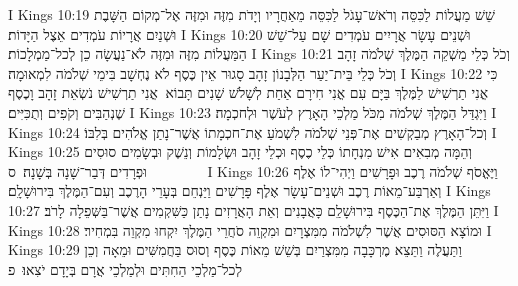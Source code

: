 I Kings 10:19	שֵׁשׁ מַעֲלוֹת לַכִּסֵּה וְרֹאשׁ־עָגֹל לַכִּסֵּה מֵאַחֲרָיו וְיָדֹת מִזֶּה וּמִזֶּה אֶל־מְקוֹם הַשָּׁבֶת וּשְׁנַיִם אֲרָיוֹת עֹמְדִים אֵצֶל הַיָּדוֹת׃
I Kings 10:20	וּשְׁנֵים עָשָׂר אֲרָיִים עֹמְדִים שָׁם עַל־שֵׁשׁ הַמַּעֲלוֹת מִזֶּה וּמִזֶּה לֹא־נַעֲשָׂה כֵן לְכל־מַמְלָכוֹת׃
I Kings 10:21	וְכֹל כְּלֵי מַשְׁקֵה הַמֶּלֶךְ שְׁלֹמֹה זָהָב וְכֹל כְּלֵי בֵּית־יַעַר הַלְּבָנוֹן זָהָב סָגוּר אֵין כֶּסֶף לֹא נֶחְשָׁב בִּימֵי שְׁלֹמֹה לִמְאוּמָה׃
I Kings 10:22	כִּי אֳנִי תַרְשִׁישׁ לַמֶּלֶךְ בַּיָּם עִם אֳנִי חִירָם אַחַת לְשָׁלֹשׁ שָׁנִים תָּבוֹא  אֳנִי תַרְשִׁישׁ נֹשְׂאֵת זָהָב וָכֶסֶף שֶׁנְהַבִּים וְקֹפִים וְתֻכִּיִּים׃
I Kings 10:23	וַיִּגְדַּל הַמֶּלֶךְ שְׁלֹמֹה מִכֹּל מַלְכֵי הָאָרֶץ לְעֹשֶׁר וּלְחכְמָה׃
I Kings 10:24	וְכל־הָאָרֶץ מְבַקְשִׁים אֶת־פְּנֵי שְׁלֹמֹה לִשְׁמֹעַ אֶת־חכְמָתוֹ אֲשֶׁר־נָתַן אֱלֹהִים בְּלִבּוֹ׃
I Kings 10:25	וְהֵמָּה מְבִאִים אִישׁ מִנְחָתוֹ כְּלֵי כֶסֶף וּכְלֵי זָהָב וּשְׂלָמוֹת וְנֵשֶׁק וּבְשָׂמִים סוּסִים וּפְרָדִים דְּבַר־שָׁנָה בְּשָׁנָה׃ {ס}        
I Kings 10:26	וַיֶּאֱסֹף שְׁלֹמֹה רֶכֶב וּפָרָשִׁים וַיְהִי־לוֹ אֶלֶף וְאַרְבַּע־מֵאוֹת רֶכֶב וּשְׁנֵים־עָשָׂר אֶלֶף פָּרָשִׁים וַיַּנְחֵם בְּעָרֵי הָרֶכֶב וְעִם־הַמֶּלֶךְ בִּירוּשָׁלָ͏ִם׃
I Kings 10:27	וַיִּתֵּן הַמֶּלֶךְ אֶת־הַכֶּסֶף בִּירוּשָׁלַ͏ִם כָּאֲבָנִים וְאֵת הָאֲרָזִים נָתַן כַּשִּׁקְמִים אֲשֶׁר־בַּשְּׁפֵלָה לָרֹב׃
I Kings 10:28	וּמוֹצָא הַסּוּסִים אֲשֶׁר לִשְׁלֹמֹה מִמִּצְרָיִם וּמִקְוֵה סֹחֲרֵי הַמֶּלֶךְ יִקְחוּ מִקְוֵה בִּמְחִיר׃
I Kings 10:29	וַתַּעֲלֶה וַתֵּצֵא מֶרְכָּבָה מִמִּצְרַיִם בְּשֵׁשׁ מֵאוֹת כֶּסֶף וְסוּס בַּחֲמִשִּׁים וּמֵאָה וְכֵן לְכל־מַלְכֵי הַחִתִּים וּלְמַלְכֵי אֲרָם בְּיָדָם יֹצִאוּ׃ {פ}
